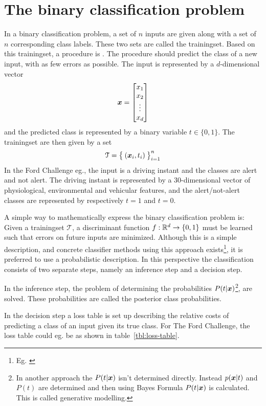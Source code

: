 \section{The binary classification problem}\label{sec:binary-classification-problem}
In a binary classification problem, a set of $n$ inputs are given along with a set of $n$ corresponding class labels. These two sets are called the trainingset. Based on this trainingset, a procedure is . The procedure should predict the class of a new input, with as few errors as possible. The input is represented by a $d$-dimensional vector 
\[
    \boldsymbol{x} = \begin{bmatrix}
        x_1 \\ 
        x_2 \\ 
        \vdots \\
        x_d 
    \end{bmatrix}
\]
and the predicted class is represented by a binary variable $t\in\{0,1\}$. The trainingset are then given by a set 
\[
    \mathcal{T} = \bigl\{\:(\boldsymbol{x}_i, t_i)\:\bigr\}_{i=1}^n 
\]
In the Ford Challenge eg., the input is a driving instant and the classes are alert and not alert. The driving instant is represented by a 30-dimensional vector of physiological, environmental and vehicular features, and the alert/not-alert classes are represented by respectively $t=1$ and $t=0$. \par
A simple way to mathematically express the binary classification problem is: Given a trainingset $\mathcal{T}$, a discriminant function $f : \mathbb{R}^d \to \{0,1\}$ must be learned such that errors on future inputs are minimized. Although this is a simple description, and concrete classifier methods using this approach exists\footnote{Eg. \citet[p.181]{bishop}}, it is preferred \citep[p.43]{bishop} to use a probabilistic description. In this perspective the classification consists of two separate steps, namely an inference step and a decision step. \par
    In the inference step, the problem of determining the probabilities $P(t|\boldsymbol{x})$\footnote{In another approach the $P(t|\boldsymbol{x})$ isn't determined directly. Instead $p(\boldsymbol{x}|t)$ and $P(t)$ are determined and then using Bayes Formula $P(t|\boldsymbol{x})$ is calculated. This is called generative modelling.}, are solved. These probabilities are called the posterior class probabilities. \par
    In the decision step a loss table is set up describing the relative costs of predicting a class of an input given its true class. For The Ford Challenge, the loss table could eg. be as shown in table~\ref{tbl:loss-table}.
